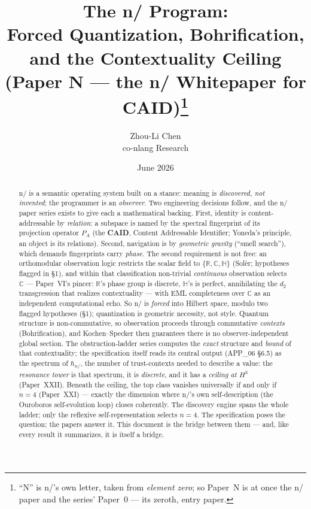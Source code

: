 \documentclass[11pt,a4paper]{article}
\title{\textbf{The n/ Program:\\
  Forced Quantization, Bohrification, and the Contextuality Ceiling}\\[4pt]
\large (Paper N --- the n/ Whitepaper for CAID)\thanks{``N'' is n/'s own letter,
taken from \emph{element zero}; so Paper~N is at once the n/ paper and the series'
Paper~0 --- its zeroth, entry paper.}}
\author{Zhou-Li Chen\\[2pt]\small co-nlang Research}
\date{June 2026}
\newcommand{\C}{\mathbb{C}}
\newcommand{\HH}{\mathbb{H}}
\newcommand{\RR}{\mathbb{R}}
\newcommand{\hbarn}{\hbar_{n/}}
\theoremstyle{plain}
\theoremstyle{definition}
\theoremstyle{remark}
\begin{document}
\maketitle

\begin{abstract}
n/ is a semantic operating system built on a stance: meaning is
\emph{discovered, not invented}; the programmer is an \emph{observer}. Two
engineering decisions follow, and the n/ paper series exists to give each a
mathematical backing. First, identity is content-addressable by \emph{relation}:
a subspace is named by the spectral fingerprint of its projection operator $P_A$
(the \textbf{CAID}, Content Addressable Identifier; Yoneda's principle, an object
is its relations). Second, navigation is by \emph{geometric gravity} (``smell
search''), which demands fingerprints carry \emph{phase}. The second requirement
is not free: an orthomodular observation logic restricts the scalar field to
$\{\RR,\C,\HH\}$ (Sol\`er; hypotheses flagged in \S1), and within that
classification non-trivial \emph{continuous} observation selects $\C$ ---
Paper~VI's pincer: $\RR$'s phase group is discrete, $\HH$'s is perfect,
annihilating the $d_2$ transgression that realizes contextuality --- with EML
completeness over $\C$ as an independent computational echo. So n/ is
\emph{forced} into Hilbert space, modulo two flagged hypotheses (\S1);
quantization is geometric necessity, not style. Quantum structure is non-commutative, so observation proceeds through
commutative \emph{contexts} (Bohrification), and Kochen--Specker then guarantees
there is no observer-independent global section. The obstruction-ladder series
computes the \emph{exact} structure and \emph{bound} of that contextuality; the
specification itself reads its central output (APP\_06 \S6.5) as the spectrum of
$\hbarn$, the number of trust-contexts needed to describe a value: the
\emph{resonance tower} is that spectrum, it is \emph{discrete}, and it has a
\emph{ceiling at $H^3$} (Paper~XXII). Beneath the ceiling, the top class vanishes
universally if and only if $n=4$ (Paper~XXI) --- exactly the dimension where n/'s
own self-description (the Ouroboros self-evolution loop) closes coherently. The
discovery engine spans the whole ladder; only the reflexive self-representation
selects $n=4$. The specification poses the question; the papers answer it. This
document is the bridge between them --- and, like every result it summarizes, it
is itself a bridge.
\end{abstract}

\end{document}
